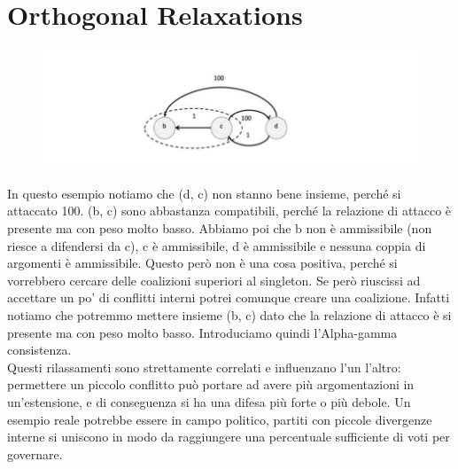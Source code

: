     \section{Orthogonal Relaxations}
    \begin{figure}[H]
        \centering
        \includegraphics[width=14cm, keepaspectratio]{img/Cap6/ortogonal.png}
    \end{figure}
    \noindent In questo esempio notiamo che (d, c) non stanno bene insieme,
    perché si attaccato 100. (b, c) sono abbastanza compatibili, perché la
    relazione di attacco è presente ma con peso molto basso. Abbiamo poi che b
    non è ammissibile (non riesce a difendersi da c), c è ammissibile, d è
    ammissibile e nessuna coppia di argomenti è ammissibile. Questo però non è
    una cosa positiva, perché si vorrebbero cercare delle coalizioni superiori
    al singleton. Se però riuscissi ad accettare un po' di conflitti interni
    potrei comunque creare una coalizione. Infatti notiamo che potremmo mettere
    insieme (b, c) dato che la relazione di attacco è si presente ma con peso
    molto basso. Introduciamo quindi l'Alpha-gamma consistenza.\\
    Questi rilassamenti sono strettamente correlati e influenzano l'un l'altro:
    permettere un piccolo conflitto può portare ad avere più argomentazioni in
    un'estensione, e di conseguenza si ha una difesa più forte o più debole. Un
    esempio reale potrebbe essere in campo politico, partiti con piccole
    divergenze interne si uniscono in modo da raggiungere una percentuale
    sufficiente di voti per governare.

